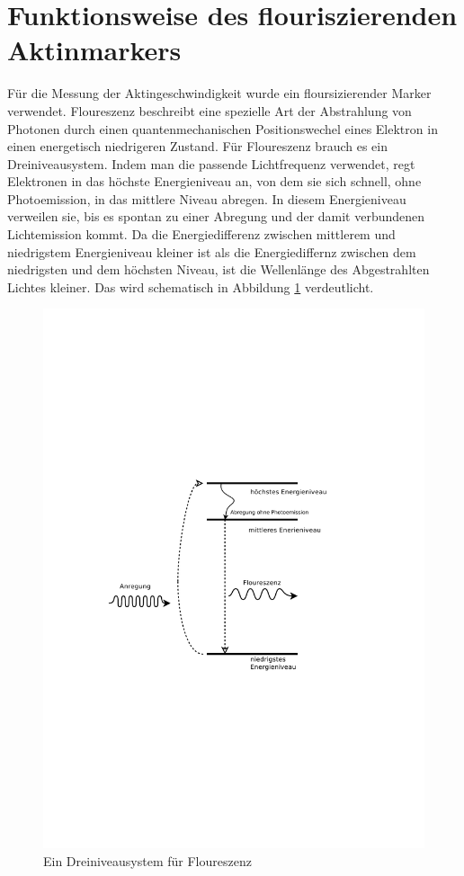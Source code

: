 \section{Funktionsweise des flouriszierenden Aktinmarkers}
Für die Messung der Aktingeschwindigkeit wurde ein floursizierender Marker verwendet.
Floureszenz beschreibt eine spezielle Art der Abstrahlung von
Photonen durch einen quantenmechanischen Positionswechel
eines Elektron in einen energetisch niedrigeren Zustand.
Für Floureszenz brauch es ein Dreiniveausystem. Indem man die passende Lichtfrequenz verwendet,
regt Elektronen in das höchste Energieniveau an,
von dem sie sich schnell, ohne Photoemission, in das mittlere Niveau abregen.
In diesem Energieniveau verweilen sie, bis es spontan zu einer 
Abregung und der damit verbundenen Lichtemission kommt.
Da die Energiedifferenz zwischen mittlerem und niedrigstem Energieniveau kleiner ist als
die Energiediffernz zwischen dem niedrigsten und dem höchsten Niveau, ist die Wellenlänge
des Abgestrahlten Lichtes kleiner. Das wird schematisch in Abbildung
\ref{fig:dreiniveausystem} verdeutlicht.

\begin{figure}[]
  \centering
  \includegraphics[width=\textwidth]{bilder/energieniveauschema.pdf}
  \caption{Ein Dreiniveausystem für Floureszenz}
  \label{fig:dreiniveausystem}
\end{figure}

